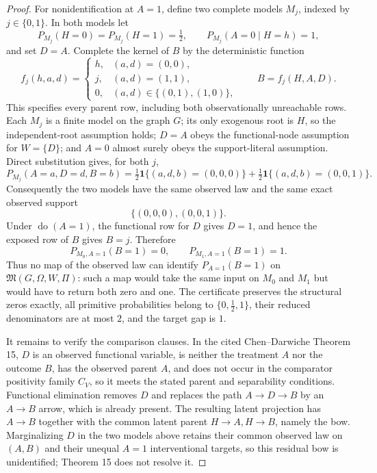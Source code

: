 \documentclass{article}
\begin{document}
\begin{proof}
For nonidentification at \(A=1\), define two complete models \(M_j\), indexed by \(j\in\{0,1\}\).  In both models let
\[
 P_{M_j}(H=0)=P_{M_j}(H=1)=\tfrac12,\qquad
 P_{M_j}(A=0\mid H=h)=1,
\]
and set \(D=A\).  Complete the kernel of \(B\) by the deterministic function
\[
 f_j(h,a,d)=
 \begin{cases}
 h,&(a,d)=(0,0),\\
 j,&(a,d)=(1,1),\\
 0,&(a,d)\in\{(0,1),(1,0)\},
 \end{cases}
 \qquad B=f_j(H,A,D).
\]
This specifies every parent row, including both observationally unreachable rows.  Each \(M_j\) is a finite model on the graph \(G\); its only exogenous root is \(H\), so the independent-root assumption holds; \(D=A\) obeys the functional-node assumption for \(W=\{D\}\); and \(A=0\) almost surely obeys the support-literal assumption.  Direct substitution gives, for both \(j\),
\[
 P_{M_j}(A=a,D=d,B=b)
 =\tfrac12\mathbf 1\{(a,d,b)=(0,0,0)\}
  +\tfrac12\mathbf 1\{(a,d,b)=(0,0,1)\}.
\]
Consequently the two models have the same observed law and the same exact observed support
\[
 \{(0,0,0),(0,0,1)\}.
\]
Under \(\operatorname{do}(A=1)\), the functional row for \(D\) gives \(D=1\), and hence the exposed row of \(B\) gives \(B=j\).  Therefore
\[
 P_{M_0,A=1}(B=1)=0,
 \qquad
 P_{M_1,A=1}(B=1)=1.
\]
Thus no map of the observed law can identify \(P_{A=1}(B=1)\) on \(\mathfrak M(G,\Omega,W,\Pi)\): such a map would take the same input on \(M_0\) and \(M_1\) but would have to return both zero and one.  The certificate preserves the structural zeros exactly, all primitive probabilities belong to \(\{0,\tfrac12,1\}\), their reduced denominators are at most \(2\), and the target gap is \(1\).

It remains to verify the comparison clauses.  In the cited Chen--Darwiche Theorem 15, \(D\) is an observed functional variable, is neither the treatment \(A\) nor the outcome \(B\), has the observed parent \(A\), and does not occur in the comparator positivity family \(C_V\), so it meets the stated parent and separability conditions.  Functional elimination removes \(D\) and replaces the path \(A\to D\to B\) by an \(A\to B\) arrow, which is already present.  The resulting latent projection has \(A\to B\) together with the common latent parent \(H\to A,H\to B\), namely the bow.  Marginalizing \(D\) in the two models above retains their common observed law on \((A,B)\) and their unequal \(A=1\) interventional targets, so this residual bow is unidentified; Theorem 15 does not resolve it.


\end{proof}
\end{document}
